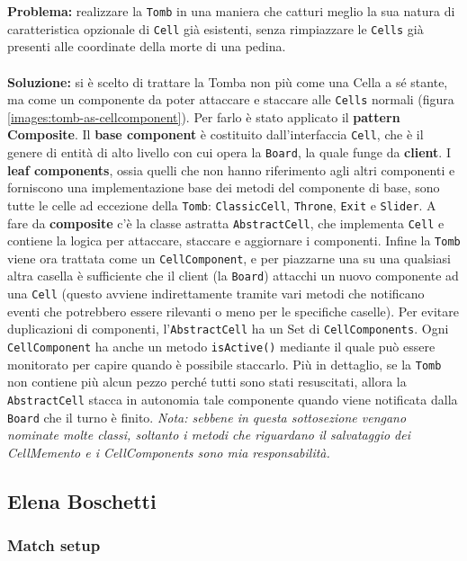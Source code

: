 \documentclass[a4paper,12pt]{report}
\begin{document}
\textbf{Problema:} realizzare la \texttt{Tomb} in una maniera che catturi meglio la sua natura di caratteristica opzionale di \texttt{Cell} già esistenti, senza rimpiazzare le \texttt{Cells} già presenti alle coordinate della morte di una pedina.
\\\\
\textbf{Soluzione:} si è scelto di trattare la Tomba non più come una Cella a sé stante, ma come un componente da poter attaccare e staccare alle \texttt{Cells} normali (figura \ref{images:tomb-as-cellcomponent}). Per farlo è stato applicato il \textbf{pattern Composite}. Il \textbf{base component} è costituito dall'interfaccia \texttt{Cell}, che è il genere di entità di alto livello con cui opera la \texttt{Board}, la quale funge da \textbf{client}. I \textbf{leaf components}, ossia quelli che non hanno riferimento agli altri componenti e forniscono una implementazione base dei metodi del componente di base, sono tutte le celle ad eccezione della \texttt{Tomb}: \texttt{ClassicCell}, \texttt{Throne}, \texttt{Exit} e \texttt{Slider}. A fare da \textbf{composite} c'è la classe astratta \texttt{AbstractCell}, che implementa \texttt{Cell} e contiene la logica per attaccare, staccare e aggiornare i componenti. Infine la \texttt{Tomb} viene ora trattata come un \texttt{CellComponent}, e per piazzarne una su una qualsiasi altra casella è sufficiente che il client (la \texttt{Board}) attacchi un nuovo componente ad una \texttt{Cell} (questo avviene indirettamente tramite vari metodi che notificano eventi che potrebbero essere rilevanti o meno per le specifiche caselle). Per evitare duplicazioni di componenti, l'\texttt{AbstractCell} ha un Set di \texttt{CellComponents}. Ogni \texttt{CellComponent} ha anche un metodo \texttt{isActive()} mediante il quale può essere monitorato per capire quando è possibile staccarlo. Più in dettaglio, se la \texttt{Tomb} non contiene più alcun pezzo perché tutti sono stati resuscitati, allora la  \texttt{AbstractCell} stacca in autonomia tale componente quando viene notificata dalla \texttt{Board} che il turno è finito.
\textit{Nota: sebbene in questa sottosezione vengano nominate molte classi, soltanto i metodi che riguardano il salvataggio dei CellMemento e i CellComponents sono mia responsabilità.}

\subsection{Elena Boschetti}

\subsubsection{Match setup}
\end{document}
